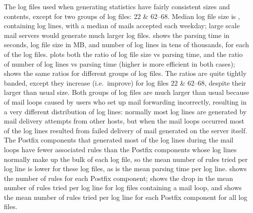 The \numberOFlogFILES{} log files used when generating statistics have
fairly consistent sizes and contents, except for two groups of log files:
22 \& 62--68.  Median log file size is
, containing
 log lines, with a median
of  mails accepted
each weekday; large scale mail servers would generate much larger log
files.   shows the parsing time in seconds, log file size in MB, and number
of log lines in tens of thousands, for each of the \numberOFlogFILES{} log
files.   plots both the ratio of log file size vs parsing time, and the
ratio of number of log lines vs parsing time (higher is more efficient in
both cases);  shows the same ratios for different groups of log files.  The
ratios are quite tightly banded, except they increase (i.e.\ improve) for
log files 22 \& 62--68, despite their larger than usual size.  Both groups
of log files are much larger than usual because of mail loops caused by
users who set up mail forwarding incorrectly, resulting in a very different
distribution of log lines: normally most log lines are generated by mail
delivery attempts from other hosts, but when the mail loops occurred most
of the log lines resulted from failed delivery of mail generated on the
server itself.  The Postfix components that generated most of the log lines
during the mail loops have fewer associated rules than the Postfix
components whose log lines normally make up the bulk of each log file, so
the mean number of rules tried per log line is lower for these log files,
as is the mean parsing time per log line.   shows the number of rules for each Postfix component;
 shows the drop in the
mean number of rules tried per log line for log files containing a mail
loop, and  shows the mean number of rules tried per log line for each
Postfix component for all log files.


